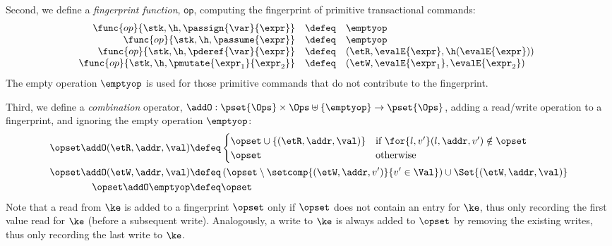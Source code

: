 \noindent Second, we define a \emph{fingerprint function}, $\mathsf{op}$, computing the fingerprint of primitive transactional commands:
\[
\begin{array}{rcl @{\quad} rcl}
\func{op}{\stk, \h, \passign{\var}{\expr}}          & \defeq & \emptyop                                     \\
\func{op}{\stk, \h, \passume{\expr}}                & \defeq & \emptyop                                     \\
\func{op}{\stk, \h,  \pderef{\var}{\expr}}           & \defeq & (\etR, \evalE{\expr}, \h(\evalE{\expr}))    \\
\func{op}{\stk,  \h, \pmutate{\expr_{1}}{\expr_{2}}} & \defeq & (\etW, \evalE{\expr_{1}}, \evalE{\expr_{2}})\\
\end{array}
\]
The  empty operation $\emptyop$ is used for those primitive commands that do not
contribute to the fingerprint.

Third, we define a \emph{combination} operator,
$\addO  : \pset{\Ops} \times \Ops \uplus \{\emptyop\} \rightarrow \pset{\Ops}$, 
adding a read/write operation to a fingerprint, and ignoring the empty operation $\emptyop$: 
\begin{align*}
    \opset \addO (\etR, \addr, \val)  
    & \defeq
    \begin{cases}
        \opset \cup \{(\etR, \addr, \val)\} & \text{if } \for{l, v'} (l, \addr, v') \notin \opset \\
        \opset &  \text{otherwise} \\
    \end{cases}  \\
    \opset \addO (\etW, \addr, \val) 
    & \defeq 
    \left( \opset \setminus \setcomp{(\etW, \addr, v')}{v' \in \Val} \right) 
    \cup \Set{(\etW, \addr, \val)}  \\
    \opset \addO \emptyop  & \defeq  \opset  \\
\end{align*}
Note that a read from $\ke$ is added to a fingerprint $\opset$ only if $\opset$ does not contain an entry for $\ke$, thus only recording the first value read for $\ke$ (before a subsequent write). 
Analogously, a write to $\ke$ is always added to $\opset$ by removing the existing writes, thus only recording the last write to $\ke$. 


